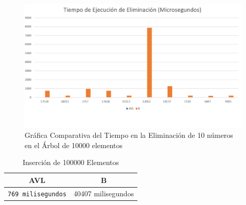 \documentclass[acmsmall]{acmart}
\begin{document}
\begin{figure}[ht]
  \centering
  \caption{Gráfica Comparativa del Tiempo en la Eliminación de 10 números en el Árbol de 10000 elementos}

  \includegraphics[angle=0,scale=0.5]{10000.3 elem.png}
  
\end{figure}


\begin{table}[htbp]
\begin{center}
  \caption{Inserción de 100000 Elementos}
  \begin{tabular}{cc}
    \toprule
    AVL & B\\
    \midrule
    \texttt{769 milisegundos} & 40407 milisegundos \\
    \bottomrule
  \end{tabular}
  \end{center}
\end{table}
\end{document}
